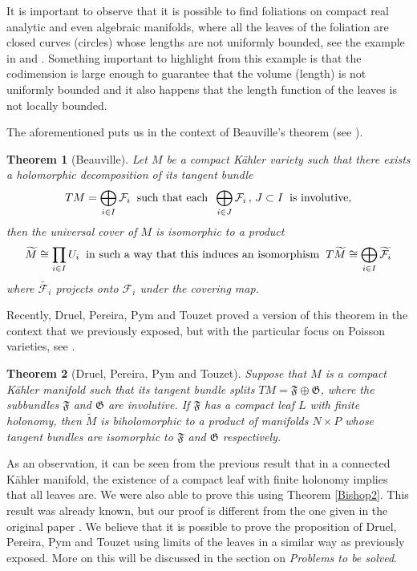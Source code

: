 \documentclass[12pt,twoside,a4paper]{report}
\newtheorem{theorem}{Theorem}[section]
\begin{document}
It is important to observe that it is possible to find foliations on compact real analytic and even algebraic manifolds, where
all the leaves of the foliation are closed curves (circles) whose lengths are not uniformly bounded, see the example in \cite{E-V} and \cite{Epstein2}.
Something important to highlight from this example is that the codimension is large enough
to guarantee that the volume (length) is not uniformly bounded and it also happens that the length function of the leaves
is not locally bounded.

The aforementioned puts us in the context of Beauville's theorem (see \cite{Beuville}).
\begin{theorem}[Beauville]\label{Beauville}
        Let $M$ be a compact Kähler variety such that there exists a holomorphic decomposition of its tangent bundle
        \[
        TM=\bigoplus_{i\in I}\mathcal{F}_i\hspace{0.2cm}\text{such that each}\hspace{0.2cm}\bigoplus_{i\in J}\mathcal{F}_i\,,\,J\subset I\hspace{0.2cm}\text{is involutive},
        \]
        then the universal cover of $M$ is isomorphic to a product
        \[
        \widetilde{M}\cong\prod_{i\in I}U_i\hspace{0.2cm}\text{in such a way that this induces an isomorphism}\hspace{0.2cm}T\widetilde{M}\cong\bigoplus_{i\in I}\widetilde{\mathcal{F}_i}
      \]
      where $\widetilde{\mathcal{F}_{i}}$ projects onto $\mathcal{F}_{i}$ under the covering map.
\end{theorem}
Recently, Druel, Pereira, Pym and Touzet proved a version of this theorem in the context that we previously exposed,
but with the particular focus on Poisson varieties, see \cite{DPPT}.
\begin{theorem}[Druel, Pereira, Pym and Touzet]\label{DPPT}
        Suppose that $M$ is a compact Kähler manifold such that its tangent bundle splits $TM=\mathfrak{F}\oplus\mathfrak{G}$, where
        the subbundles $\mathfrak{F}$ and $\mathfrak{G}$ are involutive. If $\mathfrak{F}$ has a compact leaf $L$ with finite holonomy,
        then $\widetilde{M}$ is biholomorphic to a product of manifolds $N\times P$ whose tangent bundles are isomorphic
        to $\mathfrak{F}$ and $\mathfrak{G}$ respectively.
\end{theorem}
\noindent As an observation, it can be seen from the previous result that in a connected Kähler manifold, the existence
of a compact leaf with finite holonomy implies that all leaves are. We were also able to prove this using
Theorem \ref{Bishop2}. This result was already known, but our proof is different from the one given in the
original paper \cite{Pereira}.
We believe that it is possible to prove the proposition of Druel, Pereira, Pym and Touzet using limits of the leaves
in a similar way as previously exposed. More on this will be discussed in the section on \textit{Problems to be solved}.
\end{document}
